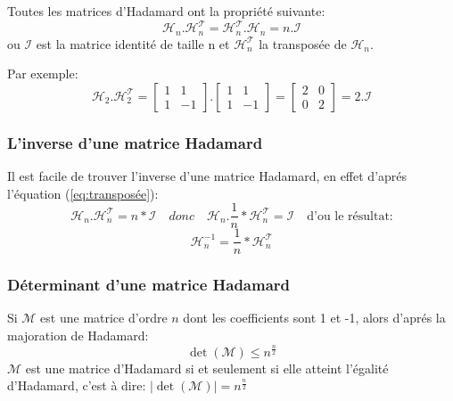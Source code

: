 \documentclass{article}
\begin{document}
Toutes les matrices d'Hadamard ont la propriété suivante:
\begin{equation}\label{eq:transposée}
	\mathcal{H}_n . \mathcal{H}_{n}^{\mathcal{T}} =
	\mathcal{H}_{n}^{\mathcal{T}}. \mathcal{H}_n = n.\mathcal{I}
\end{equation}
ou $\mathcal{I}$ est la matrice identité de taille n et 
$\mathcal{H}_{n}^{\mathcal{T}}$ la transposée de $\mathcal{H}_n$.

Par exemple:
\begin{equation*}
	\mathcal{H}_2 . \mathcal{H}_{2}^{\mathcal{T}} =
	\begin{bmatrix}
		1 & 1\\
		1 & -1
	\end{bmatrix}
	.
	\begin{bmatrix}
		1 & 1\\
		1 & -1
	\end{bmatrix}
	=
	\begin{bmatrix}
		2 & 0\\
		0 & 2
	\end{bmatrix}
	= 2 . \mathcal{I}
\end{equation*}

\subsubsection{L'inverse d'une matrice Hadamard}

Il est facile de trouver l'inverse d'une matrice Hadamard, en effet d'aprés
l'équation (\ref{eq:transposée}):
\begin{equation*}
	\mathcal{H}_n . \mathcal{H}_{n}^{\mathcal{T}} = n * \mathcal{I}
	\quad
	donc 
	\quad
	\mathcal{H}_n . \frac{1}{n}*\mathcal{H}_{n}^{\mathcal{T}} = \mathcal{I}
	\quad
	\text{d'ou le résultat:} 
\end{equation*}
\begin{equation}\label{eq:inverse}
	\mathcal{H}_{n}^{-1} =  \frac{1}{n}*\mathcal{H}_{n}^{\mathcal{T}}
\end{equation}

\subsubsection{Déterminant d'une matrice Hadamard}

Si $\mathcal{M}$ est une matrice d'ordre $n$ dont les coefficients sont 1 
et -1, alors d'aprés la majoration de Hadamard:
\begin{equation}
	\det(\mathcal{M}) \leq n^{\frac{n}{2}}
\end{equation}
$\mathcal{M}$ est une matrice d'Hadamard si et seulement si elle atteint 
l'égalité d'Hadamard, c'est à dire: 
$|\det(\mathcal{M})| = n^{\frac{n}{2}}$
\end{document}
